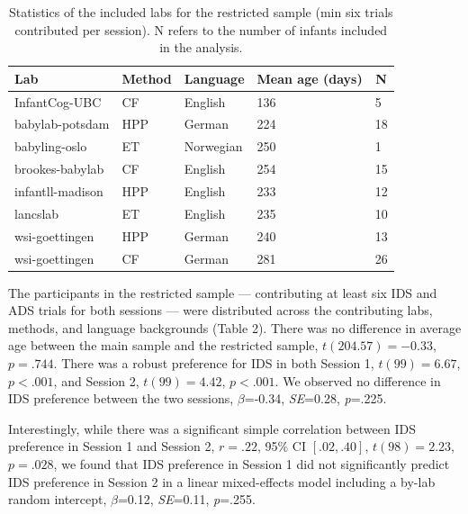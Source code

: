\documentclass[
  man, donotrepeattitle,floatsintext]{apa6}
\begin{document}
\begin{table}[tbp]

\begin{center}
\begin{threeparttable}

\caption{\label{tab:labs6}Statistics of the included labs for the restricted sample (min six trials contributed per session). N refers to the number of infants included in the analysis.}

\begin{tabular}{lllll}
\toprule
Lab & \multicolumn{1}{c}{Method} & \multicolumn{1}{c}{Language} & \multicolumn{1}{c}{Mean age (days)} & \multicolumn{1}{c}{N}\\
\midrule
InfantCog-UBC & CF & English & 136 & 5\\
babylab-potsdam & HPP & German & 224 & 18\\
babyling-oslo & ET & Norwegian & 250 & 1\\
brookes-babylab & CF & English & 254 & 15\\
infantll-madison & HPP & English & 233 & 12\\
lancslab & ET & English & 235 & 10\\
wsi-goettingen & HPP & German & 240 & 13\\
wsi-goettingen & CF & German & 281 & 26\\
\bottomrule
\end{tabular}

\end{threeparttable}
\end{center}

\end{table}

The participants in the restricted sample --- contributing at least six IDS and ADS trials for both sessions --- were distributed across the contributing labs, methods, and language backgrounds (Table 2). There was no difference in average age between the main sample and the restricted sample, \(t(204.57) = -0.33\), \(p = .744\). There was a robust preference for IDS in both Session 1, \(t(99) = 6.67\), \(p < .001\), and Session 2, \(t(99) = 4.42\), \(p < .001\). We observed no difference in IDS preference between the two sessions, \(\beta\)=-0.34, \emph{SE}=0.28, \emph{p}=.225.

Interestingly, while there was a significant simple correlation between IDS preference in Session 1 and Session 2, \(r = .22\), 95\% CI \([.02, .40]\), \(t(98) = 2.23\), \(p = .028\), we found that IDS preference in Session 1 did not significantly predict IDS preference in Session 2 in a linear mixed-effects model including a by-lab random intercept, \(\beta\)=0.12, \emph{SE}=0.11, \emph{p}=.255.
\end{document}
